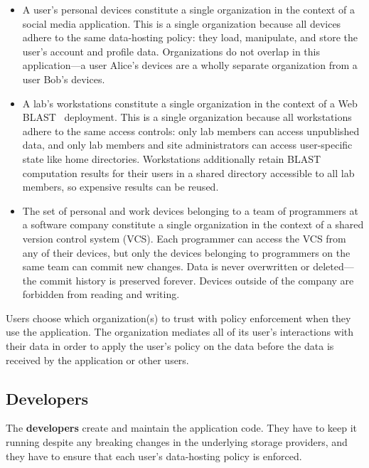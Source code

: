 \begin{itemize}
   \item A user's personal devices constitute a single organization in the context of a
      social media application.  This is a single organization because all
      devices adhere to the same data-hosting policy:  they load, manipulate,
      and store the user's account and profile data.  Organizations do not
      overlap in this application---a user Alice's devices are a wholly
      separate organization from a user Bob's devices.
   \item A lab's workstations constitute a single organization in the context of
      a Web BLAST~\cite{web-blast} deployment.  This is a single organization
      because all workstations adhere to the same access controls:  only lab members
      can access unpublished data, and only lab members and site
      administrators can access user-specific state like home directories.
      Workstations additionally retain BLAST computation results for their users
      in a shared directory accessible to all lab members, so expensive results
      can be reused.
   \item The set of personal and work devices belonging to a team of programmers
      at a software company constitute a single organization in
      the context of a shared version control system (VCS).
      Each programmer can access the VCS from any of their devices, but only the
      devices belonging to programmers on the same team can commit new changes.
      Data is never overwritten or deleted---the commit history is preserved
      forever.  Devices outside of the company are forbidden from reading and writing.
\end{itemize}

Users choose which organization(s) to trust with policy enforcement when they
use the application.  The organization mediates all of its user's interactions
with their data in order to apply the user's policy on the data before the data
is received by the application or other users.

\subsection{Developers}

The \textbf{developers} create and maintain the application code.  They have to
keep it running despite any breaking changes in the underlying storage
providers, and they have to ensure that each user's data-hosting policy is
enforced.

